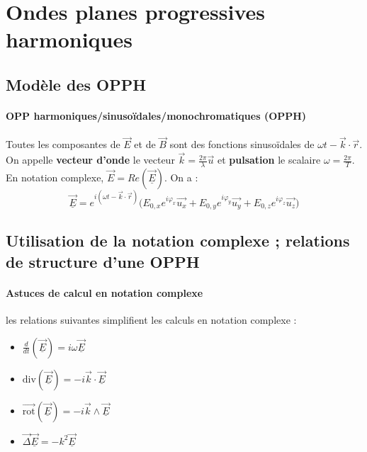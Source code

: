 \documentclass[french]{book}
\theoremstyle{plain}
\theoremstyle{definition}
\theoremstyle{remark}
\newcommand{\rot}{\overrightarrow{\text{rot}}}
\renewcommand{\div}{\text{div}}
\begin{document}
\section{Ondes planes progressives harmoniques}
\subsection{Modèle des OPPH}
\paragraph{OPP harmoniques/sinusoïdales/monochromatiques (OPPH)} Toutes les composantes de $\overrightarrow{E}$ et de $\overrightarrow{B}$ sont des fonctions sinusoïdales de $\omega t-\overrightarrow{k}\cdot\overrightarrow{r}$. On appelle \textbf{vecteur d'onde} le vecteur $\displaystyle\overrightarrow{k}=\frac{2\pi}{\lambda}\overrightarrow{u}$ et \textbf{pulsation} le scalaire $\omega=\displaystyle\frac{2\pi}{T}$. En notation complexe, $\overrightarrow{E}=Re\left(\overrightarrow{\underline{E}}\right)$. On a : $$\overrightarrow{\underline{E}}=e^{i(\omega t-\overrightarrow{k}\cdot\overrightarrow{r})}\bigg(E_{0,x}e^{i\varphi_x}\overrightarrow{u_x}+E_{0,y}e^{i\varphi_y}\overrightarrow{u_y}+E_{0,z}e^{i\varphi_z}\overrightarrow{u_z}\bigg)$$
\subsection{Utilisation de la notation complexe ; relations de structure d'une OPPH}
\paragraph{Astuces de calcul en notation complexe} les relations suivantes simplifient les calculs en notation complexe :
\begin{itemize}
	\item $\displaystyle \frac{d}{dt}\left(\overrightarrow{\underline{E}}\right)=i\omega\overrightarrow{\underline{E}}$
	\item $\displaystyle \div\left(\overrightarrow{\underline{E}}\right)=-i\overrightarrow{k}\cdot\overrightarrow{\underline{E}}$
	\item $\displaystyle \rot\left(\overrightarrow{\underline{E}}\right)=-i\overrightarrow{k}\wedge\overrightarrow{\underline{E}}$
	\item $\displaystyle\overrightarrow{\Delta}\overrightarrow{\underline{E}}=-k^2\overrightarrow{\underline{E}}$
\end{itemize}
\end{document}
